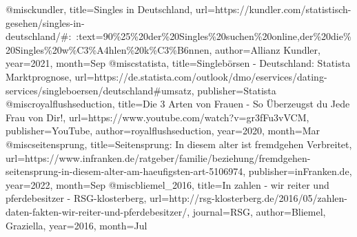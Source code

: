 \documentclass[german, version-2020-11]{uzl-thesis}
\begin{document}
  
  
  
  


  \begin{bibtex-entries}
    @misc{kundler, 
      title={Singles in Deutschland}, 
      url={https://kundler.com/statistisch-gesehen/singles-in-deutschland/#:~:text=90\%25\%20der\%20Singles\%20suchen\%20online,der\%20die\%20Singles\%20w\%C3\%A4hlen\%20k\%C3\%B6nnen}, 
      author={Allianz Kundler}, 
      year={2021}, 
      month={Sep}
    } 
    @misc{statista, 
      title={Singlebörsen - Deutschland: Statista Marktprognose},
      url={https://de.statista.com/outlook/dmo/eservices/dating-services/singleboersen/deutschland#umsatz},
      publisher={Statista}
    } 
    @misc{royalflushseduction, 
      title={Die 3 Arten von Frauen - So Überzeugst du Jede Frau von Dir!}, 
      url={https://www.youtube.com/watch?v=gr3fFu3vVCM}, 
      publisher={YouTube}, 
      author={royalflushseduction}, 
      year={2020}, 
      month={Mar}
    } 
    @misc{seitensprung, 
      title={Seitensprung: In diesem alter ist fremdgehen Verbreitet}, 
      url={https://www.infranken.de/ratgeber/familie/beziehung/fremdgehen-seitensprung-in-diesem-alter-am-haeufigsten-art-5106974},  
      publisher={inFranken.de},  
      year={2022}, 
      month={Sep}
    }
    @misc{bliemel_2016, 
      title={In zahlen - wir reiter und pferdebesitzer - RSG-klosterberg}, 
      url={http://rsg-klosterberg.de/2016/05/zahlen-daten-fakten-wir-reiter-und-pferdebesitzer/}, 
      journal={RSG}, 
      author={Bliemel, Graziella}, 
      year={2016}, 
      month={Jul}
    } 

  \end{bibtex-entries}
\end{document}
